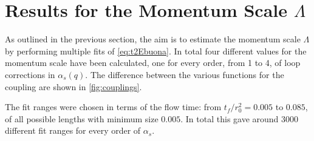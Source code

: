 \section{Results for the Momentum Scale $\Lambda$} 
As outlined in the previous section, the aim is to estimate the momentum scale $\Lambda$ by performing multiple fits of \cref{eq:t2Ebuona}. In total four different values for the momentum scale have been calculated, one for every order, from 1 to 4, of loop corrections in $\alpha_s(q)$. The difference between the various functions for the coupling are shown in \cref{fig:couplings}. 


The fit ranges were chosen in terms of the flow time: from $t_f/r_0^2 = 0.005$ to $0.085$, of all possible lengths with minimum size $0.005$. In total this gave around 3000 different fit ranges for every order of $\alpha_s$. 
